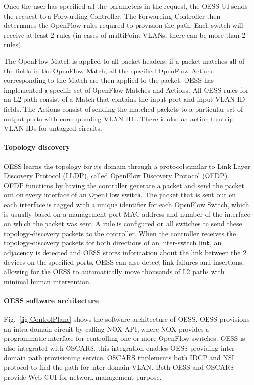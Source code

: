 Once the user has specified all the parameters in the request, the OESS UI sends the request to a Forwarding Controller. The Forwarding Controller then determines the OpenFlow rules required to provision the path. Each switch will receive at least 2 rules (in cases of multiPoint VLANs, there can be more than 2 rules).


The OpenFlow Match is applied to all packet headers; if a packet matches all of the fields in the OpenFlow Match, all the specified OpenFlow Actions corresponding to the Match are then applied to the packet. OESS has implemented a specific set of OpenFlow Matches and Actions. All OESS rules for an L2 path consist of a Match that contains the
input port and input VLAN ID fields. The Actions consist of sending the matched packets to a particular set of output ports with corresponding VLAN IDs. There is also an action to strip VLAN IDs for untagged circuits.

\paragraph{Topology discovery}
OESS learns the topology for its domain through a protocol similar to Link Layer Discovery Protocol (LLDP), called OpenFlow Discovery Protocol (OFDP). OFDP functions by having the controller generate a packet and send the packet out on every interface of an OpenFlow switch. The packet that is sent out on each interface is tagged with a unique identifier for each OpenFlow Switch, which is usually based on a management port MAC address and number of the interface on which the packet was sent. A rule is configured on all switches to send these topology-discovery packets to the controller. When the controller receives the topology-discovery packets for both directions of an inter-switch link, an adjacency is detected and OESS stores information about the link between the 2 devices on the specified ports. OESS can also detect link failures and insertions, allowing for the OESS to automatically move thousands of L2 paths with minimal human intervention.

\paragraph{OESS software architecture}
Fig.~\ref{fig:ControlPlane} shows the software architecture of OESS. OESS provisions an intra-domain circuit by calling NOX \cite{gude2008nox} API, where NOX provides a programmatic interface for controlling one or more OpenFlow switches. OESS is also integrated with OSCARS, this integration enables OESS providing inter-domain path provisioning service. OSCARS implements both IDCP and NSI protocol to find the path for inter-domain VLAN. Both OESS and OSCARS provide Web GUI for network management purpose.

